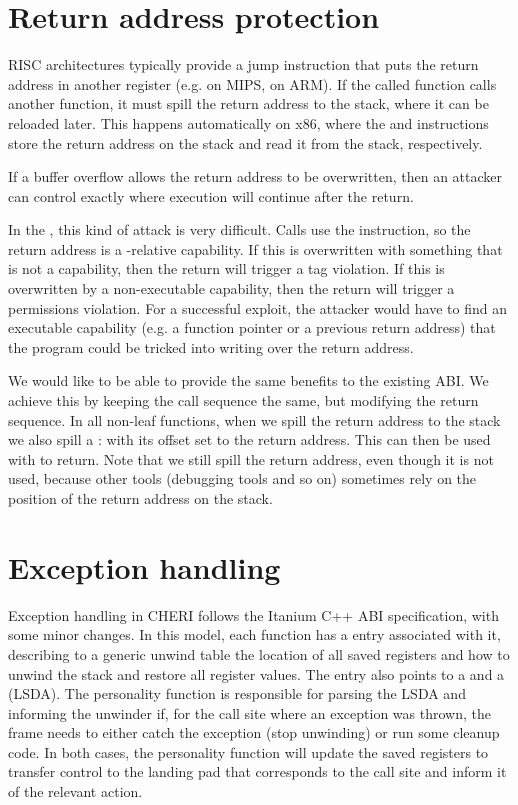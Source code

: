 \section{Return address protection}

RISC architectures typically provide a jump instruction that puts the return address in another register (e.g.  on MIPS,  on ARM).
If the called function calls another function, it must spill the return address to the stack, where it can be reloaded later.
This happens automatically on x86, where the  and  instructions store the return address on the stack and read it from the stack, respectively.

If a buffer overflow allows the return address to be overwritten, then an attacker can control exactly where execution will continue after the return.

In the \sandboxABI{}, this kind of attack is very difficult.
Calls use the  instruction, so the return address is a -relative capability.
If this is overwritten with something that is not a capability, then the return will trigger a tag violation.
If this is overwritten by a non-executable capability, then the return will trigger a permissions violation.
For a successful exploit, the attacker would have to find an executable capability (e.g. a function pointer or a previous return address) that the program could be tricked into writing over the return address.

We would like to be able to provide the same benefits to the existing ABI.
We achieve this by keeping the call sequence the same, but modifying the return sequence.
In all non-leaf functions, when we spill the return address to the stack we also spill a :  with its offset set to the return address.
This can then be used with  to return.
Note that we still spill the return address, even though it is not used, because other tools (debugging tools and so on) sometimes rely on the position of the return address on the stack.


\section{Exception handling}

Exception handling in CHERI follows the Itanium C++ ABI specification, with some minor changes.
In this model, each function has a  entry associated with it, describing to a generic unwind table the location of all saved registers and how to unwind the stack and restore all register values.
The  entry also points to a  and a  (LSDA).
The personality function is responsible for parsing the LSDA and informing the unwinder if, for the call site where an exception was thrown, the frame needs to either catch the exception (stop unwinding) or run some cleanup code.
In both cases, the personality function will update the saved registers to transfer control to the landing pad that corresponds to the call site and inform it of the relevant action.


